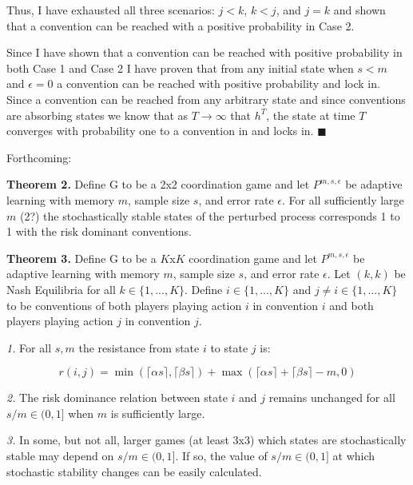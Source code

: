 \documentclass{article}
\begin{document}
\vskip12pt

Thus, I have exhausted all three scenarios: $j<k$, $k<j$, and $j=k$ and shown that a convention can be reached with a positive probability in Case 2.

\vskip18pt

Since I have shown that a convention can be reached with positive probability in both Case 1 and Case 2 I have proven that from any initial state when $s<m$ and $\epsilon=0$ a convention can be reached with positive probability and lock in. Since a convention can be reached from any arbitrary state and since conventions are absorbing states we know that as $T \rightarrow \infty$ that $h^T$, the state at time $T$ converges with probability one to a convention in and locks in. $\blacksquare$

\pagebreak

Forthcoming:

\textbf{Theorem 2.} Define G to be a 2x2 coordination game and let $P^{m,s,\epsilon}$ be adaptive learning with memory $m$, sample size $s$, and error rate $\epsilon$. For all sufficiently large $m$ (2?) the stochastically stable states of the perturbed process corresponds 1 to 1 with the risk dominant conventions.

\vskip12pt

\textbf{Theorem 3.} Define G to be a $K$x$K$ coordination game and let $P^{m,s,\epsilon}$ be adaptive learning with memory $m$, sample size $s$, and error rate $\epsilon$. Let $(k,k)$ be Nash Equilibria for all $k \in \{1,...,K\}$. Define $i \in \{1,...,K\}$ and $j \neq i \in \{1,...,K\}$ to be conventions of both players playing action $i$ in convention $i$ and both players playing action $j$ in convention $j$.

\textit{1.} For all $s, m$ the resistance from state $i$ to state $j$ is:

$$r(i,j)=\min(\lceil \alpha s \rceil,\lceil \beta s \rceil)+\max(\lceil \alpha s \rceil+\lceil \beta s \rceil-m,0)$$

\textit{2.} The risk dominance relation between state $i$ and $j$ remains unchanged for all $s/m \in (0,1]$ when $m$ is sufficiently large.

\textit{3.} In some, but not all, larger games (at least 3x3) which states are stochastically stable may depend on $s/m \in (0,1]$. If so, the value of $s/m \in (0,1]$ at which stochastic stability changes can be easily calculated.

\end{document}

